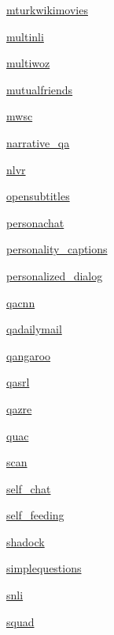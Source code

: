\begin{DoxyCompactItemize}
 \hyperlink{namespaceparlai_1_1tasks_1_1mturkwikimovies}{mturkwikimovies}
\item 
 \hyperlink{namespaceparlai_1_1tasks_1_1multinli}{multinli}
\item 
 \hyperlink{namespaceparlai_1_1tasks_1_1multiwoz}{multiwoz}
\item 
 \hyperlink{namespaceparlai_1_1tasks_1_1mutualfriends}{mutualfriends}
\item 
 \hyperlink{namespaceparlai_1_1tasks_1_1mwsc}{mwsc}
\item 
 \hyperlink{namespaceparlai_1_1tasks_1_1narrative__qa}{narrative\+\_\+qa}
\item 
 \hyperlink{namespaceparlai_1_1tasks_1_1nlvr}{nlvr}
\item 
 \hyperlink{namespaceparlai_1_1tasks_1_1opensubtitles}{opensubtitles}
\item 
 \hyperlink{namespaceparlai_1_1tasks_1_1personachat}{personachat}
\item 
 \hyperlink{namespaceparlai_1_1tasks_1_1personality__captions}{personality\+\_\+captions}
\item 
 \hyperlink{namespaceparlai_1_1tasks_1_1personalized__dialog}{personalized\+\_\+dialog}
\item 
 \hyperlink{namespaceparlai_1_1tasks_1_1qacnn}{qacnn}
\item 
 \hyperlink{namespaceparlai_1_1tasks_1_1qadailymail}{qadailymail}
\item 
 \hyperlink{namespaceparlai_1_1tasks_1_1qangaroo}{qangaroo}
\item 
 \hyperlink{namespaceparlai_1_1tasks_1_1qasrl}{qasrl}
\item 
 \hyperlink{namespaceparlai_1_1tasks_1_1qazre}{qazre}
\item 
 \hyperlink{namespaceparlai_1_1tasks_1_1quac}{quac}
\item 
 \hyperlink{namespaceparlai_1_1tasks_1_1scan}{scan}
\item 
 \hyperlink{namespaceparlai_1_1tasks_1_1self__chat}{self\+\_\+chat}
\item 
 \hyperlink{namespaceparlai_1_1tasks_1_1self__feeding}{self\+\_\+feeding}
\item 
 \hyperlink{namespaceparlai_1_1tasks_1_1shadock}{shadock}
\item 
 \hyperlink{namespaceparlai_1_1tasks_1_1simplequestions}{simplequestions}
\item 
 \hyperlink{namespaceparlai_1_1tasks_1_1snli}{snli}
\item 
 \hyperlink{namespaceparlai_1_1tasks_1_1squad}{squad}

\end{DoxyCompactItemize}
